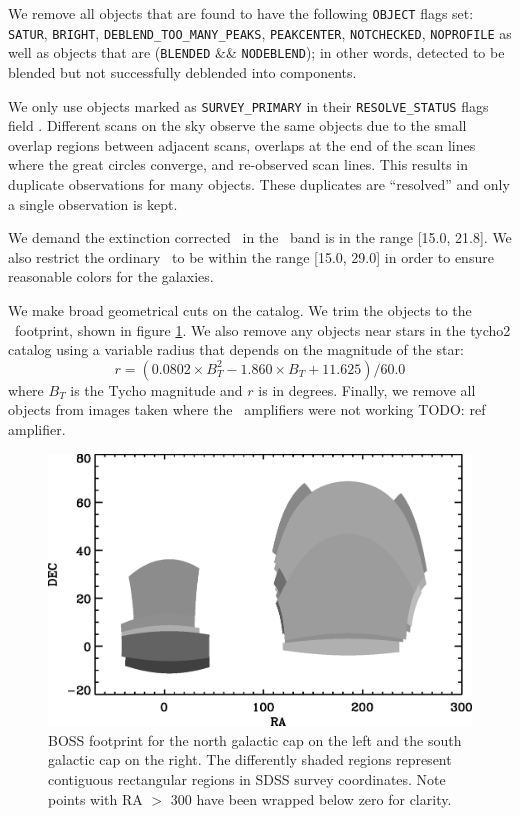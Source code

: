 \documentclass{emulateapj}
\newcommand{\modelrmin}{15.0}
\newcommand{\modelrmax}{29.0}
\newcommand{\rmin}{15.0}
\newcommand{\rmax}{21.8}
\begin{document}
We remove all objects that are found to have the following \texttt{OBJECT}
flags set: \texttt{SATUR}, \texttt{BRIGHT}, \texttt{DEBLEND\_TOO\_MANY\_PEAKS},
\texttt{PEAKCENTER}, \texttt{NOTCHECKED}, \texttt{NOPROFILE} as well as objects
that are (\texttt{BLENDED} \&\& \texttt{NODEBLEND}); in other words, detected
to be blended but not successfully deblended into components. 

We only use objects marked as \texttt{SURVEY\_PRIMARY} in their
\texttt{RESOLVE\_STATUS} flags field \citep{dr7resolve}. Different scans on the
sky observe the same objects due to the small overlap regions between adjacent
scans, overlaps at the end of the scan lines where the great circles converge,
and re-observed scan lines.  This results in duplicate observations for many
objects.  These duplicates are ``resolved'' and only a single observation is
kept.

We demand the extinction corrected \citep{Schlegel98} \cmodelmag\ in the \rmag\
band is in the range [\rmin, \rmax].  We also restrict the ordinary \modelmag\
to be within the range [\modelrmin, \modelrmax] in order to ensure reasonable
colors for the galaxies.

We make broad geometrical cuts on the catalog.  We trim the objects to the
\boss\ footprint, shown in figure \ref{fig:footprint}. We also remove any
objects near stars in the tycho2 catalog \citep{tycho2} using a variable radius
that depends on the magnitude of the star:
\begin{equation}
r = (0.0802\times B_T^2 - 1.860\times B_T + 11.625)/60.0
\end{equation}
where $B_T$ is the Tycho magnitude and $r$ is in degrees.  Finally, we remove
all objects from images taken where the \umag\ amplifiers were not working
{\color{red}TODO: ref amplifier}.

\begin{figure}[t] \centering
 \centering 
 \includegraphics[scale=0.75]{figures/boss-poly-coverage.eps}
 \caption{BOSS footprint for the north galactic cap on the left
 and the south galactic cap on the right.  The differently shaded
 regions represent contiguous rectangular regions in SDSS survey coordinates.
 Note points with RA $>$ 300 have been wrapped below zero for clarity.}
 \label{fig:footprint}
\end{figure}
\end{document}
